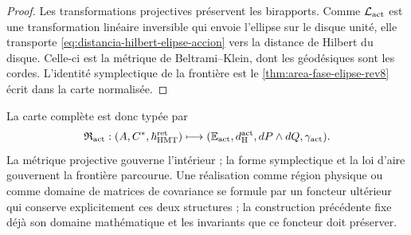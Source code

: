 \begin{proof}
Les transformations projectives préservent les birapports. Comme
\(\mathcal L_{\rm act}\) est une transformation linéaire inversible qui envoie
l'ellipse sur le disque unité, elle transporte
\eqref{eq:distancia-hilbert-elipse-accion} vers la distance de Hilbert du
disque. Celle-ci est la métrique de Beltrami--Klein, dont les géodésiques sont les cordes.
L'identité symplectique de la frontière est le
\cref{thm:area-fase-elipse-rev8} écrit dans la carte normalisée.
\end{proof}

La carte complète est donc typée par
\[
 \mathfrak R_{\rm act}:
 (A,C^*,\hbar_{\rm HMT}^{\rm ret})
 \longmapsto
 (\mathbb E_{\rm act},d_{\rm H}^{\rm act},
  dP\wedge dQ,\gamma_{\rm act}).
\]
La métrique projective gouverne l'intérieur ; la forme symplectique et la loi
d'aire gouvernent la frontière parcourue. Une réalisation comme région physique ou
comme domaine de matrices de covariance se formule par un foncteur ultérieur
qui conserve explicitement ces deux structures ; la construction précédente
fixe déjà son domaine mathématique et les invariants que ce foncteur doit préserver.
